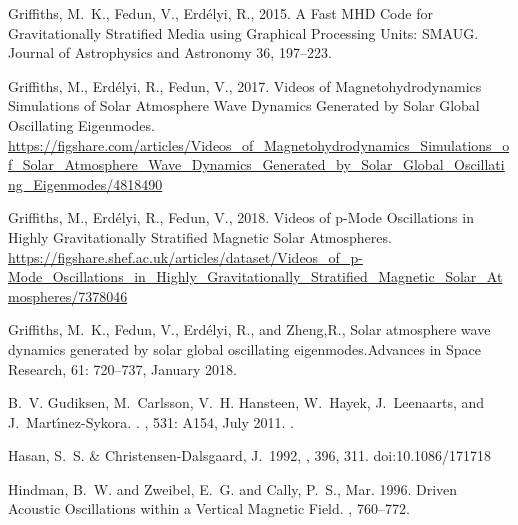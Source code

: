 \documentclass[linenumbers]{aastex63}
\begin{document}
\begin{thebibliography}{}
{Griffiths}, M.~K., {Fedun}, V., {Erd{\'e}lyi}, R., 2015. {A Fast MHD Code for
  Gravitationally Stratified Media using Graphical Processing Units: SMAUG}.
  Journal of Astrophysics and Astronomy 36, 197--223.

{Griffiths}, M., {Erd{\'e}lyi}, R., {Fedun}, V., 2017. {Videos of
  Magnetohydrodynamics Simulations of Solar Atmosphere Wave Dynamics Generated
  by Solar Global Oscillating Eigenmodes}.
\newline \url{https://figshare.com/articles/Videos_of_Magnetohydrodynamics_Simulations_of_Solar_Atmosphere_Wave_Dynamics_Generated_by_Solar_Global_Oscillating_Eigenmodes/4818490}

{Griffiths}, M., {Erd{\'e}lyi}, R., {Fedun}, V., 2018. {Videos of p-Mode Oscillations in Highly Gravitationally Stratified Magnetic Solar Atmospheres}.
\newline \url{https://figshare.shef.ac.uk/articles/dataset/Videos_of_p-Mode_Oscillations_in_Highly_Gravitationally_Stratified_Magnetic_Solar_Atmospheres/7378046}




{Griffiths}, M.~K., {Fedun}, V., {Erd{\'e}lyi}, R., and {Zheng},R.,
{Solar atmosphere wave dynamics generated by solar global oscillating
  eigenmodes}.{Advances in Space Research}, 61: 720--737, January 2018.

B.~V. {Gudiksen}, M.~{Carlsson}, V.~H. {Hansteen}, W.~{Hayek}, J.~{Leenaarts},
  and J.~{Mart{\'{\i}}nez-Sykora}.
.
\newblock \emph{\aap}, 531: A154, July 2011.
\newblock {}.


 Hasan, S.~S. \& Christensen-Dalsgaard, J.\ 1992, \apj, 396, 311. doi:10.1086/171718



{Hindman}, B.~W. and {Zweibel}, E.~G. and {Cally}, P.~S., Mar. 1996. {Driven Acoustic Oscillations within a Vertical Magnetic Field}. , 760--772.


\end{thebibliography}
\end{document}
